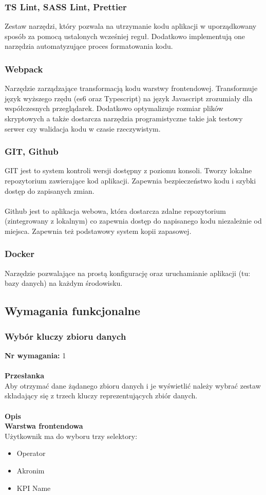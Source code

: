 \documentclass[eng,printmode]{mgr}
\begin{document}
\subsubsection{TS Lint, SASS Lint, Prettier}
Zestaw narzędzi, który pozwala na utrzymanie kodu aplikacji w uporządkowany sposób za pomocą ustalonych wcześniej reguł. Dodatkowo implementują one narzędzia automatyzujące proces formatowania kodu.
\subsubsection{Webpack}
Narzędzie zarządzające transformacją kodu warstwy frontendowej. Transformuje język wyższego rzędu (es6 oraz Typescript) na język Javascript zrozumiały dla współczesnych przeglądarek. Dodatkowo optymalizuje rozmiar plików skryptowych a także dostarcza narzędzia programistyczne takie jak testowy serwer czy walidacja kodu w czasie rzeczywistym.
\subsubsection{GIT, Github}
GIT jest to system kontroli wersji dostępny z poziomu konsoli. Tworzy lokalne repozytorium zawierające kod aplikacji. Zapewnia bezpieczeństwo kodu i szybki dostęp do zapisanych zmian.
\\\\
Github jest to aplikacja webowa, która dostarcza zdalne repozytorium (zintegrowany z lokalnym) co zapewnia dostęp do napisanego kodu niezależnie od miejsca. Zapewnia też podstawowy system kopii zapasowej.
\subsubsection{Docker}
Narzędzie pozwalające na prostą konfigurację oraz uruchamianie aplikacji (tu: bazy danych) na każdym środowisku.
\subsection{Wymagania funkcjonalne}
\subsubsection{Wybór kluczy zbioru danych}
\textbf{Nr wymagania:} 1 
\\\\
\textbf{Przesłanka}\\
Aby otrzymać dane żądanego zbioru danych i je wyświetlić należy wybrać zestaw składający się z trzech kluczy reprezentujących zbiór danych.
\\\\
\textbf{Opis}\\
\textbf{Warstwa frontendowa} \\
Użytkownik ma do wyboru trzy selektory:
\begin{itemize}
\item Operator
\item Akronim
\item KPI Name
\end{itemize}
\end{document}
